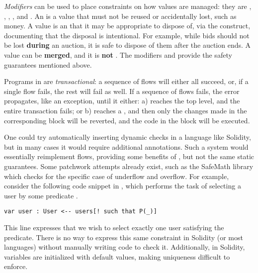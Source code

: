 \documentclass[dvipsnames,runningheads]{llncs}
\begin{document}
\emph{Modifiers} can be used to place constraints on how values are managed: they are , , , , and .
An  is a value that must not be reused or accidentally lost, such as money.
A  value is an  that it may be appropriate to dispose of, via the  construct, documenting that the disposal is intentional.
For example, while bids should not be lost \textbf{during} an auction, it is safe to dispose of them after the auction ends.
A  value can be \textbf{merged}, and it is \textbf{not} .
The modifiers  and  provide the safety guarantees mentioned above.


Programs in \langName are \emph{transactional}: a sequence of flows will either all succeed, or, if a single flow fails, the rest will fail as well.
If a sequence of flows fails, the error propagates, like an exception, until it either: a) reaches the top level, and the entire transaction fails; or b) reaches a , and then only the changes made in the corresponding  block will be reverted, and the code in the  block will be executed.

One could try automatically inserting dynamic checks in a language like Solidity, but in many cases it would require additional annotations.
Such a system would essentially reimplement flows, providing some benefits of \langName, but not the same static guarantees.
Some patchwork attempts already exist, such as the SafeMath library which checks for the specific case of underflow and overflow.
For example, consider the following code snippet in \langName, which performs the task of selecting a user by some predicate .
\begin{lstlisting}[language=flow]
var user : User <-- users[! such that P(_)]
\end{lstlisting}
This line expresses that we wish to select exactly one user satisfying the predicate.
There is no way to express this same constraint in Solidity (or most languages) without manually writing code to check it.
Additionally, in Solidity, variables are initialized with default values, making uniqueness difficult to enforce.
\end{document}
